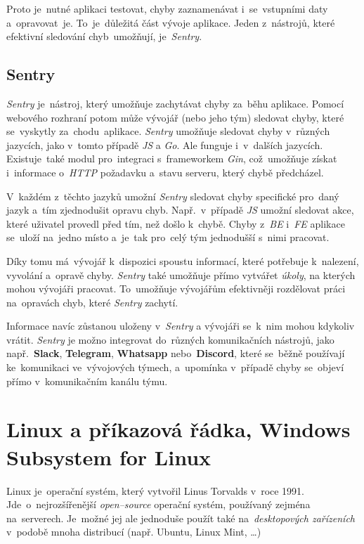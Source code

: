 \documentclass[11pt,a4paper]{report}
\let\oldacrshort\acrshort
\renewcommand{\acrshort}[1]{\emph{\normalsize\color[rgb]{0,0,0}\noindent\oldacrshort{#1}}}
\begin{document}
                Proto je~nutné aplikaci testovat, chyby zaznamenávat i~se~vstupními daty a~opravovat~je. To~je~důležitá část vývoje aplikace. Jeden z~nástrojů, které efektivní sledování chyb~umožňují, je~\emph{Sentry}.

            \subsection{Sentry}
                \emph{Sentry} je~nástroj, který umožňuje zachytávat chyby za~běhu aplikace. Pomocí webového rozhraní potom může vývojář (nebo jeho tým) sledovat chyby, které se~vyskytly za~chodu~aplikace. \emph{Sentry} umožňuje sledovat chyby v~různých jazycích, jako v~tomto případě \acrshort{JS} a \emph{Go}. Ale funguje i~v~dalších jazycích. Existuje~také modul pro~integraci s~frameworkem \emph{Gin}, což~umožňuje získat i~informace o~\acrshort{HTTP} požadavku a~stavu serveru, který chybě předcházel.
                
                V~každém z~těchto jazyků umožní \emph{Sentry} sledovat chyby specifické pro~daný jazyk a~tím zjednodušit opravu chyb. Např.~v~případě \acrshort{JS} umožní sledovat akce, které uživatel provedl před tím, než došlo k~chybě. Chyby z~\acrshort{BE} i~\acrshort{FE} aplikace se~uloží na~jedno místo a~je~tak pro~celý tým jednodušší s~nimi pracovat.

                Díky tomu má~vývojář k~dispozici spoustu informací, které potřebuje k~nalezení, vyvolání a~opravě chyby. \emph{Sentry} také umožňuje přímo vytvářet \emph{úkoly}, na kterých mohou vývojáři pracovat. To~umožňuje vývojářům efektivněji rozdělovat práci na~opravách chyb, které \emph{Sentry} zachytí.

                Informace navíc zůstanou uloženy v~\emph{Sentry} a vývojáři se~k~nim mohou kdykoliv vrátit. \emph{Sentry} je možno integrovat do~různých komunikačních nástrojů, jako např.~\textbf{Slack}, \textbf{Telegram}, \textbf{Whatsapp} nebo~\textbf{Discord}, které se~běžně používají ke~komunikaci ve~vývojových týmech, a~upomínka v~případě chyby se~objeví přímo v~komunikačním kanálu týmu.

        \section{Linux a příkazová řádka, Windows Subsystem for Linux}
            Linux je~operační systém, který vytvořil Linus Torvalds v~roce 1991. Jde~o~nejrozšířenější \emph{open--source} operační systém, používaný zejména na~serverech. Je~možné jej ale jednoduše použít také na~\emph{desktopových zařízeních} v~podobě mnoha distribucí (např. Ubuntu, Linux Mint, \dots)
            
\end{document}
